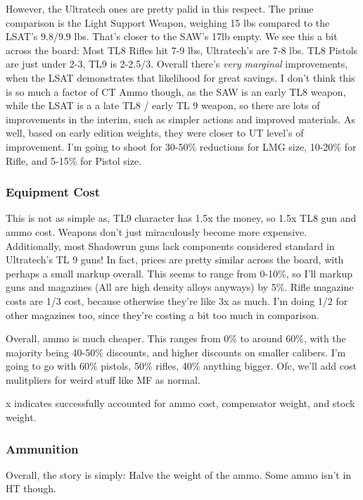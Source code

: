\begin{multicols*}{2}
	 However, the Ultratech ones are pretty palid in this respect. The prime comparison is the Light Support Weapon, weighing 15 lbs compared to the LSAT's 9.8/9.9 lbs. That's closer to the SAW's 17lb empty. We see this a bit across the board: Most TL8 Rifles hit 7-9 lbs, Ultratech's are 7-8 lbs. TL8 Pistols are just under 2-3, TL9 is 2-2.5/3. Overall there's \textit{very marginal} improvements, when the LSAT demonstrates that likelihood for great savings. I don't think this is so much a factor of CT Ammo though,  as the SAW is an early TL8 weapon, while the LSAT is a a late TL8 / early TL 9 weapon, so there are lots of improvements in the interim, such as simpler actions and improved materials. As well, based on early edition weights, they were closer to UT level's of improvement.  I'm going to shoot for 30-50\% reductions for LMG size, 10-20\% for Rifle, and 5-15\% for Pistol size.
	 
	 \subsubsection{Equipment Cost}
	 
	 This is not as simple as, TL9 character has 1.5x the money, so 1.5x TL8 gun and ammo cost. Weapons don't just miraculously become more expensive. Additionally, most Shadowrun guns lack components considered standard in Ultratech's TL 9 guns! In fact, prices are pretty similar across the board, with perhaps a small markup overall. This seems to range from 0-10\%, so I'll markup guns and magazines (All are high density alloys anyways) by 5\%. Rifle magazine costs are 1/3 cost, because otherwise they're like 3x as much. I'm doing 1/2 for other magazines too, since they're costing a bit too much in comparison.
	 
	 Overall, ammo is much cheaper. This ranges from 0\% to around 60\%, with the majority being 40-50\% discounts, and higher discounts on smaller calibers. I'm going to go with 60\% pistols, 50\% rifles, 40\% anything bigger. Ofc, we'll add cost mulitpliers for weird stuff like MF as normal.
	 
	 x indicates successfully accounted for ammo cost, compensator weight, and stock weight.
	 
	 \subsubsection{Ammunition}
	 Overall, the story is simply: Halve the weight of the ammo. Some ammo isn't in HT though. 
	 

\end{multicols*}
